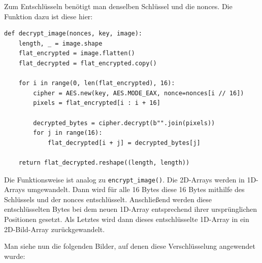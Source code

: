 Zum Entschlüsseln benötigt man denselben Schlüssel und die nonces. Die Funktion dazu ist diese hier:
\begin{lstlisting}
def decrypt_image(nonces, key, image):
    length, _ = image.shape
    flat_encrypted = image.flatten()
    flat_decrypted = flat_encrypted.copy()

    for i in range(0, len(flat_encrypted), 16):
        cipher = AES.new(key, AES.MODE_EAX, nonce=nonces[i // 16])
        pixels = flat_encrypted[i : i + 16]

        decrypted_bytes = cipher.decrypt(b"".join(pixels))
        for j in range(16):
            flat_decrypted[i + j] = decrypted_bytes[j]

    return flat_decrypted.reshape((length, length))
\end{lstlisting}
Die Funktionsweise ist analog zu \lstinline{encrypt_image()}. Die 2D-Arrays werden in 1D-Arrays umgewandelt. Dann wird für alle
16 Bytes diese 16 Bytes mithilfe des Schlüssels und der nonces entschlüsselt. Anschließend werden diese entschlüsselten Bytes
bei dem neuen 1D-Array entsprechend ihrer ursprünglichen Positionen gesetzt. Als Letztes wird dann dieses entschlüsselte 1D-Array
in ein 2D-Bild-Array zurückgewandelt.

Man siehe nun die folgenden Bilder, auf denen diese 
Verschlüsselung angewendet wurde:

